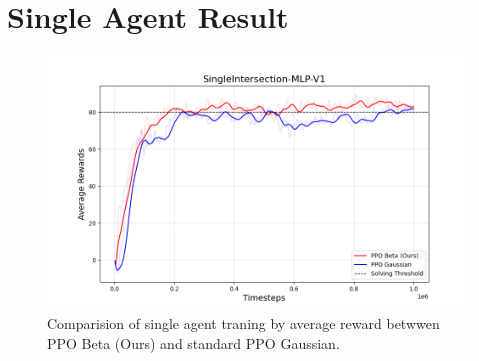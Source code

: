 \section{Single Agent Result}\label{sec:single-agent-result}
\begin{figure}[H]
    \centering
    \includegraphics[width=14cm]{assets/ppo_single}
    \caption{Comparision of single agent traning by average reward betwwen
PPO Beta (Ours) and standard PPO Gaussian.}\label{fig:single_agent_training_reward}
\end{figure}
